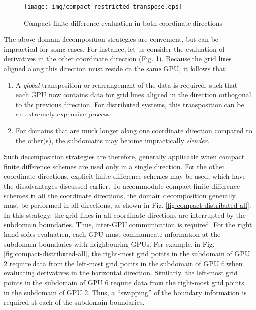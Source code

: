 \begin{figure}
\begin{center}
\texttt{[image: img/compact-restricted-transpose.eps]}
\caption{Compact finite difference evaluation in both coordinate directions}
\label{fig:compact-restricted-transpose}
\end{center}
\end{figure}

The above domain decomposition strategies are convenient,
but can be impractical for some cases.
For instance,
let us consider the evaluation of derivatives
in the other coordinate direction
(Fig. \ref{fig:compact-restricted-transpose}).
Because the grid lines aligned along this direction
must reside on the same GPU,
it follows that:
%
\begin{enumerate}
\item A \emph{global} transposition or rearrangement
    of the data is required,
    such that each GPU now contains data for
    grid lines aligned in the direction orthogonal
    to the previous direction.
    For distributed systems,
    this transposition can be an extremely expensive process.

\item For domains that are much longer along one coordinate
    direction compared to the other(s),
    the subdomains may become impractically \emph{slender}.
\end{enumerate}
%
Such decomposition strategies are therefore, generally applicable
when compact finite difference schemes are used only
in a single direction.
For the other coordinate directions,
explicit finite difference schemes may be used,
which have the disadvantages discussed earlier.
To accommodate compact finite difference schemes in all the coordinate
directions,
the domain decomposition generally must be performed in all directions,
as shown in Fig. \ref{fig:compact-distributed-all}.
In this strategy,
the grid lines in all coordinate directions
are interrupted by the subdomain boundaries.
Thus,
inter-GPU communication is required.
For the right hand sides evaluation,
each GPU must communicate information at the subdomain boundaries
with neighbouring GPUs.
For example, in Fig. \ref{fig:compact-distributed-all},
the right-most grid points in the subdomain of
GPU 2 require data from the
left-most grid points in the subdomain of
GPU 6 when evaluating derivatives in the horizontal direction.
Similarly,
the left-most grid points in the subdomain of
GPU 6 require data from the
right-most grid points in the subdomain of
GPU 2.
Thus, a ``swapping'' of the boundary information
is required at each of the subdomain boundaries.

